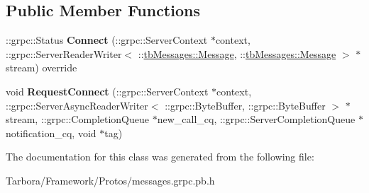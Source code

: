 \subsection*{Public Member Functions}
\begin{DoxyCompactItemize}
\item 
\mbox{\label{classtbMessages_1_1TarboraMessages_1_1WithRawMethod__Connect_a6b456bc50376f9141bf93a455d2d2c44}} 
\+::grpc\+::\+Status {\bfseries Connect} (\+::grpc\+::\+Server\+Context $\ast$context, \+::grpc\+::\+Server\+Reader\+Writer$<$ \+::\hyperlink{classtbMessages_1_1Message}{tb\+Messages\+::\+Message}, \+::\hyperlink{classtbMessages_1_1Message}{tb\+Messages\+::\+Message} $>$ $\ast$stream) override
\item 
\mbox{\label{classtbMessages_1_1TarboraMessages_1_1WithRawMethod__Connect_a9b316940224f18aafbd8a1655d5fd5a7}} 
void {\bfseries Request\+Connect} (\+::grpc\+::\+Server\+Context $\ast$context, \+::grpc\+::\+Server\+Async\+Reader\+Writer$<$ \+::grpc\+::\+Byte\+Buffer, \+::grpc\+::\+Byte\+Buffer $>$ $\ast$stream, \+::grpc\+::\+Completion\+Queue $\ast$new\+\_\+call\+\_\+cq, \+::grpc\+::\+Server\+Completion\+Queue $\ast$notification\+\_\+cq, void $\ast$tag)
\end{DoxyCompactItemize}


The documentation for this class was generated from the following file\+:\begin{DoxyCompactItemize}
\item 
Tarbora/\+Framework/\+Protos/messages.\+grpc.\+pb.\+h\end{DoxyCompactItemize}

